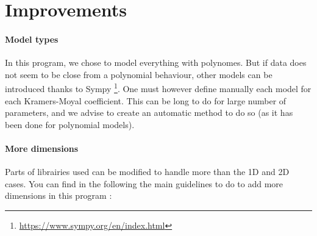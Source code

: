 \documentclass[A4paper]{article}
\begin{document}
\section{Improvements}
\paragraph{Model types}
In this program, we chose to model everything with polynomes. But if data does not seem to be close from a polynomial behaviour, other models can be introduced thanks to Sympy \footnote{\url{https://www.sympy.org/en/index.html}}. One must however define manually each model for each Kramers-Moyal coefficient. This can be long to do for large number of parameters, and we advise to create an automatic method to do so (as it has been done for polynomial models).

\paragraph{More dimensions}
Parts of librairies used can be modified to handle more than the 1D and 2D cases. You can find in the following the main guidelines to do to add more dimensions in this program :
\end{document}
